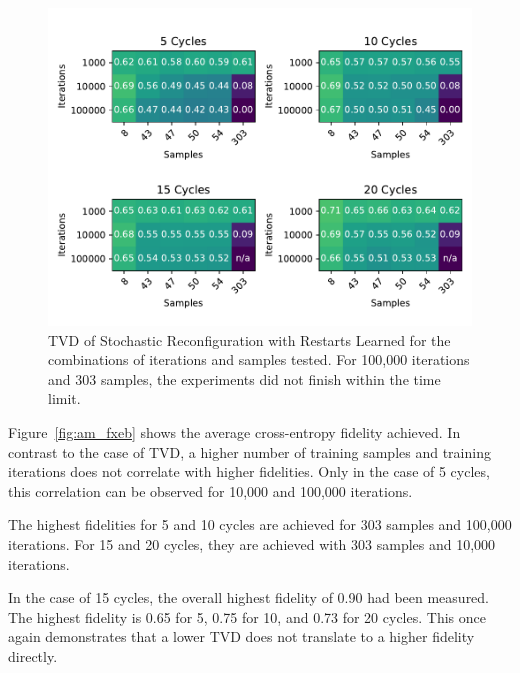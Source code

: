 \begin{figure}[H]
  \centering
  \includegraphics[width=\textwidth]{figures/results/AM-restarts-learned/tvd_heatmap.pdf}
  \caption[TVD of AdaMax with Restarts Learned]{TVD of Stochastic 
  Reconfiguration with Restarts Learned for the combinations of iterations and samples tested.
  For 100,000 iterations and 303 samples, the experiments did not finish within the time limit.}
  \label{fig:am_tvd}
\end{figure}

Figure~\ref{fig:am_fxeb} shows the average cross-entropy fidelity achieved. In contrast to the case 
of TVD, a higher number of training samples and training iterations does not correlate with higher 
fidelities. Only in the case of 5 cycles, this correlation can be observed for 10,000 and 100,000 iterations.

The highest fidelities for 5 and 10 cycles are achieved for 303 samples and 100,000 iterations. For 
15 and 20 cycles, they are achieved with 303 samples and 10,000 iterations. 

In the case of 15 cycles, the overall highest fidelity of 0.90 had been measured. The highest fidelity is 0.65 for 5, 0.75 for 10, and 0.73 for 20 cycles.
This once again demonstrates that a lower TVD does not translate to a higher fidelity directly.

